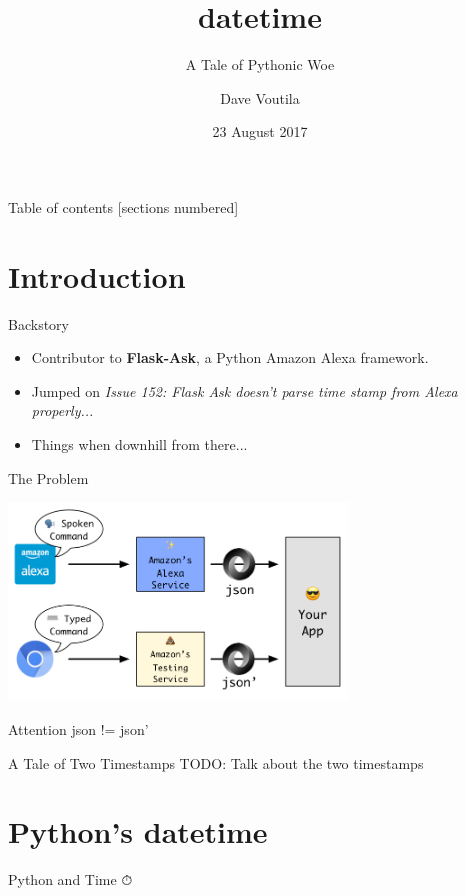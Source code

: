 \documentclass[10pt]{beamer}
\title{datetime}
\subtitle{A Tale of Pythonic Woe}
\date{23 August 2017}
\author{Dave Voutila}
\institute{Sisu Integrated Services, LLC}
\begin{document}
\maketitle

\begin{frame}{Table of contents}
  [sections numbered]
  \tableofcontents[hideallsubsections]
\end{frame}

\section{Introduction}
\begin{frame}[fragile]{Backstory}
\begin{itemize}
\item Contributor to \textbf{Flask-Ask}, a Python Amazon Alexa framework.
\item Jumped on \textit{Issue 152: Flask Ask doesn't parse time stamp from Alexa properly...}
\item Things when downhill from there...
\end{itemize}

\end{frame}

\begin{frame}{The Problem}
\begin{center}
	\includegraphics[width=9cm]{./images/alexa-flow.png}
	\begin{alertblock}{Attention}
		json != json'
	\end{alertblock}
\end{center}
\end{frame}

\begin{frame}{A Tale of Two Timestamps}
TODO: Talk about the two timestamps
\end{frame}

\section{Python's datetime}
\begin{frame}{Python and Time ⏱}
\end{frame}
\end{document}
